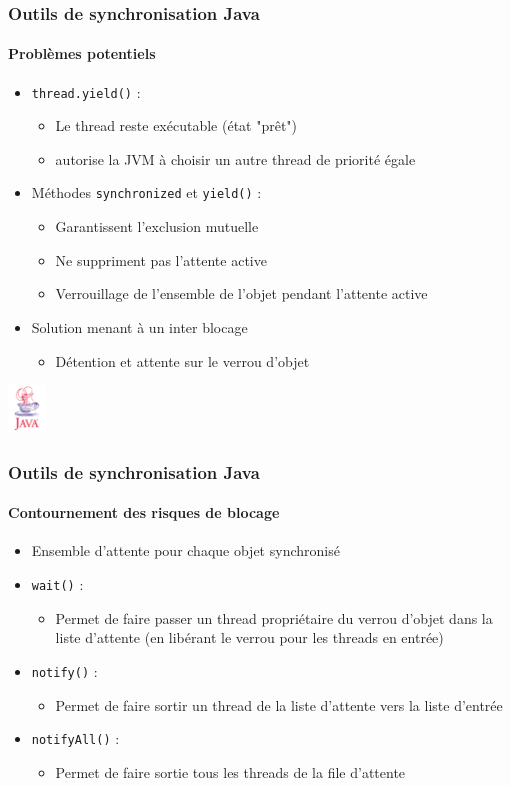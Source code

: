 \begin{frame}
\frametitle{Outils de synchronisation Java}
\framesubtitle{Problèmes potentiels}
\begin{itemize}
\item \texttt{thread.yield()} :
\begin{itemize}
\item Le thread reste exécutable (état "prêt")
\item autorise la JVM à choisir un autre thread de priorité égale
\end{itemize}
\item Méthodes \texttt{synchronized} et \texttt{yield()} :
\begin{itemize}
\item Garantissent l’exclusion mutuelle
\item Ne suppriment pas l’attente active
\item Verrouillage de l’ensemble de l’objet pendant l’attente active
\end{itemize}
\item Solution menant à un inter blocage
\begin{itemize}
\item Détention et attente sur le verrou d'objet
\end{itemize}

\end{itemize}
\begin{flushright}
\includegraphics[width=1cm]{../illustration/java.png}
\end{flushright}
\end{frame}

\begin{frame}
\frametitle{Outils de synchronisation Java}
\framesubtitle{Contournement des risques de blocage}
\begin{itemize}
\item Ensemble d’attente pour chaque objet synchronisé
\item \texttt{wait()} :
\begin{itemize}
\item Permet de faire passer un thread propriétaire du verrou d’objet dans la liste d’attente (en libérant le verrou pour les threads en entrée)
\end{itemize}
\item \texttt{notify()} :
\begin{itemize}
\item Permet de faire sortir un thread de la liste d’attente vers la liste d’entrée
\end{itemize}
\item \texttt{notifyAll()} :
\begin{itemize}
\item Permet de faire sortie tous les threads de la file d’attente
\end{itemize}
\end{itemize}
\end{frame}

